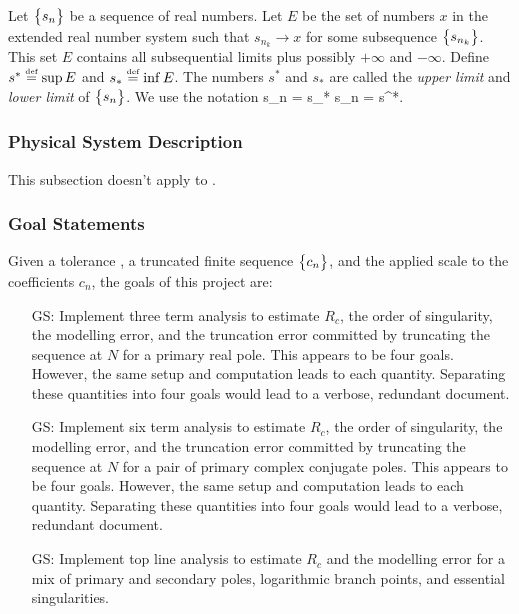\documentclass[12pt]{article}
\newcounter{goalnum} %
\begin{document}
Let $\bigl\{ {s_n} \bigr\}$ be a sequence of real numbers. Let $E$ be the set of numbers $x$ in the extended real number
system such that $s_{n_k} \rightarrow x$ for some subsequence $\bigl\{ {s_{n_k}} \bigr\}$.
This set $E$ contains all subsequential limits plus possibly $+\infty$ and $-\infty$. Define $s^* \stackrel{\textup{\tiny def}}{=} \sup E$ and
$s_* \stackrel{\textup{\tiny def}}{=} \inf E$. The numbers $s^*$ and $s_*$ are called the {\it upper limit} and {\it lower limit}
of $\bigl\{ {s_n} \bigr\}$. We use the notation
\EQ
{
   s_n = s_* \qquad{}\qquad {} s_n = s^*.
}

\subsubsection{Physical System Description} \label{sec_phySystDescrip}

This subsection doesn't apply to .

\subsubsection{Goal Statements}\label{ssc:goal-statements}

\Ni Given a tolerance \tol, a truncated finite sequence $\bigl\{ {c_n} \bigr\}$, and the applied scale
to the coefficients $c_n$, the goals of this project are:

\begin{itemize}
\item[GS\refstepcounter{goalnum}\thegoalnum \label{G_3ta}:] Implement \cite{chang1982} three term analysis
to estimate $R_c$, the order of singularity, the modelling error, and the truncation error committed
by truncating the sequence at $N$ for a primary real pole. This appears to be four goals. However,
the same setup and computation leads to each quantity. Separating these quantities into four goals
would lead to a verbose, redundant document.

\item[GS\refstepcounter{goalnum}\thegoalnum \label{G_6ta}:] Implement \cite{chang1982} six term analysis
to estimate $R_c$, the order of singularity, the modelling error, and the truncation error committed
by truncating the sequence at $N$ for a pair of primary complex conjugate poles. This appears to be
four goals. However, the same setup and computation leads to each quantity. Separating these quantities
into four goals would lead to a verbose, redundant document.

\item[GS\refstepcounter{goalnum}\thegoalnum \label{G_topline}:] Implement \cite{chang1982} top line analysis
to estimate $R_c$ and the modelling error for a mix of primary and secondary poles,
logarithmic branch points, and essential singularities.
\end{itemize}
\end{document}

